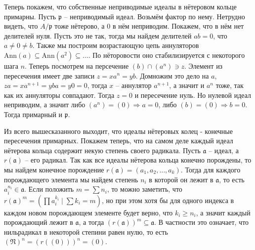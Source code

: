 \documentclass{article}
\begin{document}
\begin{enumerate}
        Теперь покажем, что собственные неприводимые идеалы в нётеровом кольце
        примарны. Пусть $\mathfrak{p}$ – неприводимый идеал. Возьмём фактор по
        нему. Нетрудно видеть, что $A/\mathfrak{p}$ тоже нётерово, а 0 в нём
        неприводим. Покажем, что
        в нём нет делителей нуля. Пусть это не так, тогда мы найдем делителей
        $ab=0$, что $a\neq0\neq b$. Также мы построим возрастающую цепь аннуляторов
        $\text{Ann}(a)\subseteq\text{Ann}(a^2)\subseteq\ldots$. По нёторовости
        оно стабилизируется с некоторого шага $n$. Теперь посмотрем на
        персечение $(b)\cap(a^n)\ni z$. Элемент из пересечения имеет две записи
        $z=xa^n=yb$. Домножим это дело на $a$, $za=xa^{n+1}=yba=y0=0$, тогда $x$
        – аннулятор $a^{n+1}$, а значит и $a^n$ тоже, так как их аннуляторы
        совпадают. Тогда $z=0$ и пересечение нуль. Но нулевой идеал неприводим,
        а значит либо $(a^n)=(0)\Rightarrow a=0$, либо $(b)=(0)\Rightarrow b=0$.
        Тогда примарный и $\mathfrak{p}$.

        Из всего вышесказанного выходит, что идеалы нётеровых колец - конечные
        пересечения примарных. Покажем теперь, что на самом деле каждый идеал
        нётерова кольца содержит некую степень своего радикала. Пусть $\mathfrak{a}$
        – идеал, а $r(\mathfrak{a})$ – его радикал. Так как все идеалы нётерова
        кольца конечно порождены, то мы найдем конечное порождение $r(\mathfrak{a})
        =(a_1,a_2,\ldots,a_k)$. Тогда для каждого порождающего элемента мы найдем
        степень $n_i$ в которой он лежит в $\mathfrak{a}$, то есть $a_i^{n_i}\in
        \mathfrak{a}$. Если положить $m=\sum n_i$, то можно заметить, что
        $r(\mathfrak{a})^m=(\prod a_i^{k_i}\;|\;\sum k_i=m)$, но при этом хотя бы
        для одного индекса в каждом новом порождающем элементе будет верно, что
        $k_i\geq n_i$, а значит каждый порождающий лежит в $\mathfrak{a}$, а
        тогда $(r(\mathfrak{a}))^m\subseteq\mathfrak{a}$. В частности это означает,
        что нильрадикал в некоторой степини равен нулю, то есть $(\mathfrak{N})^n
        =(r((0)))^n=(0)$.


\end{enumerate}
\end{document}
